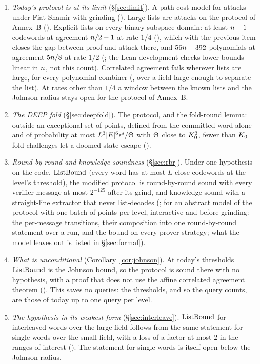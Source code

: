 \begin{enumerate}[itemsep=2pt,topsep=3pt]
\item \emph{Today's protocol is at its limit} (\S\ref{sec:limit}). A path-cost model for attacks under Fiat-Shamir with grinding (\stpr). Large lists are attacks on the protocol of Annex~B (\stpr). Explicit lists on every binary subspace domain: at least $n-1$ codewords at agreement $n/2-1$ at rate $1/4$ (\stmc), which with the previous item closes the gap between proof and attack there, and $56n-392$ polynomials at agreement $5n/8$ at rate $1/2$ (\stpr; the Lean development checks lower bounds linear in $n$, not this count). Correlated agreement fails wherever lists are large, for every polynomial combiner (\stmc, over a field large enough to separate the list). At rates other than $1/4$ a window between the known lists and the Johnson radius stays open for the protocol of Annex~B.
\item \emph{The DEEP fold} (\S\ref{sec:deepfold}). The protocol, and the fold-round lemma: outside an exceptional set of points, defined from the committed word alone and of probability at most $L^3|E|^6\epsilon^s/\Theta$ with $\Theta$ close to $K_0^3$, fewer than $K_0$ fold challenges let a doomed state escape (\stmc).
\item \emph{Round-by-round and knowledge soundness} (\S\ref{sec:rbr}). Under one hypothesis on the code, $\mathrm{ListBound}$ (every word has at most $L$ close codewords at the level's threshold), the modified protocol is round-by-round sound with every verifier message at most $2^{-125}$ after its grind, and knowledge sound with a straight-line extractor that never list-decodes (\stpr; \stmc{} for an abstract model of the protocol with one batch of points per level, interactive and before grinding: the per-message transitions, their composition into one round-by-round statement over a run, and the bound on every prover strategy; what the model leaves out is listed in \S\ref{sec:formal}).
\item \emph{What is unconditional} (Corollary~\ref{cor:johnson}). At today's thresholds $\mathrm{ListBound}$ is the Johnson bound, so the protocol is sound there with no hypothesis, with a proof that does not use the affine correlated agreement theorem (\stpr). This saves no queries: the thresholds, and so the query counts, are those of today up to one query per level.
\item \emph{The hypothesis in its weakest form} (\S\ref{sec:interleave}). $\mathrm{ListBound}$ for interleaved words over the large field follows from the same statement for single words over the small field, with a loss of a factor at most $2$ in the ranges of interest (\stmc). The statement for single words is itself open below the Johnson radius.

\end{enumerate}
